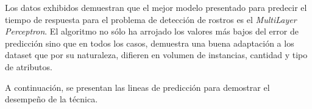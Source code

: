 \begin{table}[H]
\begin{doublespace}
\begin{centering}
\par\end{centering}
\end{doublespace}

\caption{Resultados obtenidos del caso de estudio tres. \label{tab:caso-de-estudio-3}}
\end{table}


Los datos exhibidos demuestran que el mejor modelo presentado para
predecir el tiempo de respuesta para el problema de detección de rostros
es el \emph{MultiLayer Perceptron}. El algoritmo no sólo ha arrojado
los valores más bajos del error de predicción sino que en todos los
casos, demuestra una buena adaptación a los dataset que por su naturaleza,
difieren en volumen de instancias, cantidad y tipo de atributos. 

A continuación, se presentan las lineas de predicción para demostrar
el desempeño de la técnica.

